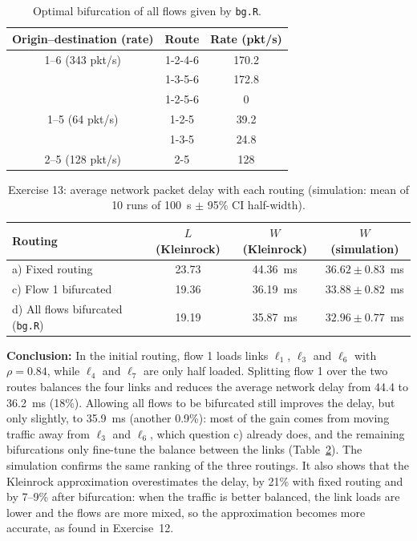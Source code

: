 ﻿\documentclass[12pt]{article}
\begin{document}
\begin{table}[H]
    \centering
    \caption{Optimal bifurcation of all flows given by \texttt{bg.R}.}
    \label{tab:bg}
    \begin{tabular}{c|c|c}
        Origin--destination (rate) & Route & Rate (pkt/s) \\
        \hline
        1--6 (343 pkt/s) & 1-2-4-6 & 170.2 \\
                         & 1-3-5-6 & 172.8 \\
                         & 1-2-5-6 & 0 \\
        \hline
        1--5 (64 pkt/s)  & 1-2-5 & 39.2 \\
                         & 1-3-5 & 24.8 \\
        \hline
        2--5 (128 pkt/s) & 2-5   & 128 \\
    \end{tabular}
\end{table}

\begin{table}[H]
    \centering
    \caption{Exercise 13: average network packet delay with each routing (simulation: mean of 10 runs of 100~s $\pm$ 95\% CI half-width).}
    \label{tab:pnet13summary}
    \begin{tabular}{l|c|c|c}
        Routing & $L$ (Kleinrock) & $W$ (Kleinrock) & $W$ (simulation) \\
        \hline
        a) Fixed routing                & 23.73 & 44.36~ms & $36.62\pm0.83$~ms \\
        c) Flow 1 bifurcated            & 19.36 & 36.19~ms & $33.88\pm0.82$~ms \\
        d) All flows bifurcated (\texttt{bg.R}) & 19.19 & 35.87~ms & $32.96\pm0.77$~ms \\
    \end{tabular}
\end{table}

\textbf{Conclusion:} In the initial routing, flow 1 loads links $\ell_1$,
$\ell_3$ and $\ell_6$ with $\rho=0.84$, while $\ell_4$ and $\ell_7$ are only half
loaded. Splitting flow 1 over the two routes balances the four links and
reduces the average network delay from 44.4 to 36.2~ms (18\%). Allowing all
flows to be bifurcated still improves the delay, but only slightly, to
35.9~ms (another 0.9\%): most of the gain comes from moving traffic away from
$\ell_3$ and $\ell_6$, which question c) already does, and the remaining
bifurcations only fine-tune the balance between the links
(Table~\ref{tab:pnet13summary}). The simulation confirms the same ranking of the
three routings. It also shows that the Kleinrock approximation overestimates
the delay, by 21\% with fixed routing and by 7--9\% after bifurcation: when the
traffic is better balanced, the link loads are lower and the flows are more
mixed, so the approximation becomes more accurate, as found in Exercise~12.
\end{document}
